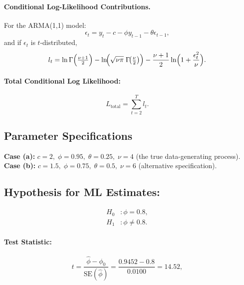 \documentclass[a4paper,12pt]{article}
\begin{document}
\paragraph{Conditional Log-Likelihood Contributions.}
For the ARMA(1,1) model:
\begin{equation}
    \epsilon_t = y_t - c - \phi y_{t-1} - \theta \epsilon_{t-1},
    \label{eq:cml}
\end{equation}
and if \(\epsilon_t\) is \(t\)-distributed,
\begin{equation}
    l_{t} = \ln \Gamma\Bigl(\tfrac{\nu + 1}{2}\Bigr)
          - \ln\!\Bigl(\sqrt{\nu \pi}\;\Gamma\!\bigl(\tfrac{\nu}{2}\bigr)\Bigr)
          - \frac{\nu + 1}{2} \ln\Bigl(1 + \frac{\epsilon_t^2}{\nu}\Bigr).
    \label{eq:ll}
\end{equation}

\paragraph{Total Conditional Log Likelihood:}
\begin{equation}
    L_{\text{total}} = \sum_{t=2}^{T} l_t.
    \label{eq:tcl}
\end{equation}

\subsection{Parameter Specifications}

\textbf{Case (a):} \(c = 2, \; \phi = 0.95, \; \theta = 0.25, \; \nu = 4\) (the true data-generating process).\\
\textbf{Case (b):} \(c = 1.5, \; \phi = 0.75, \; \theta = 0.5, \; \nu = 6\) (alternative specification).
\label{specifica}

\subsection{Hypothesis for ML Estimates:}

\begin{equation}
\begin{aligned}
    H_0 &: \phi = 0.8,\\
    H_1 &: \phi \neq 0.8.
\end{aligned}
\label{eq:nullacht}
\end{equation}

\paragraph{Test Statistic:}
\begin{equation}
    t = \frac{\hat{\phi} - \phi_0}{\text{SE}(\hat{\phi})}=\frac{0.9452 - 0.8}{0.0100} = 14.52,
    \label{eq:tstatmlone}
\end{equation}
\end{document}
